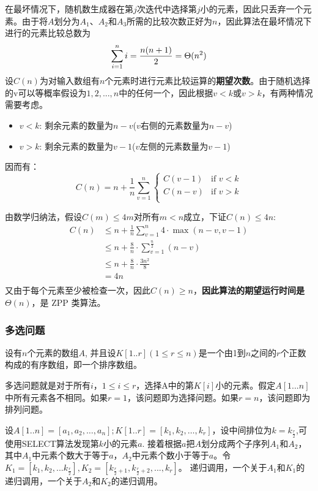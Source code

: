 \documentclass[./../main.tex]{subfiles} %
\begin{document}
在最坏情况下，随机数生成器在第$j$次迭代中选择第$j$小的元素，因此只丢弃一个元素。由于将$A$划分为$A_1$、$A_2$和$A_3$所需的比较次数正好为$n$，因此算法在最坏情况下进行的元素比较总数为
$$
\sum_{i=1}^n i=\frac{n(n+1)}{2}=\Theta(n^2)\\
$$
设$C(n)$为对输入数组有$n$个元素时进行元素比较运算的\textbf{期望次数}。由于随机选择的v可以等概率假设为$1,2,...,n$中的任何一个，因此根据$v<k$或$v>k$，有两种情况需要考虑。
\begin{itemize}
    \item $v<k$: 剩余元素的数量为$n-v$($v$右侧的元素数量为$n-v$)
    \item $v>k$: 剩余元素的数量为$v-1$($v$左侧的元素数量为$v-1$)
\end{itemize}

因而有：
$$
C(n)=n+\frac{1}{n}\sum_{v=1}^n\left\{
    \begin{array}{lc}
        C(v-1) & \text{if }v<k\\ 
        C(n-v) & \text{if }v>k\\
    \end{array}
\right.
$$

由数学归纳法，假设$C(m)\le4m$对所有$m<n$成立，下证$C(n)\le4n$:
\begin{align*}
    C(n)&\le n + \frac{1}{n}\sum_{v=1}^n4\cdot\max(n-v, v-1)\\
    &\le n + \frac{8}{n}\cdot \sum_{v=1}^{\frac{n}{2}}(n-v)\\
    &\le n + \frac{8}{n}\cdot \frac{3n^2}{8}\\
    &=  4n\\
\end{align*}
又由于每个元素至少被检查一次，因此$C(n)\ge n$，\textbf{因此算法的期望运行时间是}$\Theta(n)$，是 ZPP 类算法。

\subsubsection{多选问题}
设有$n$个元素的数组$A$, 并且设$K[1..r](1\le r\le n)$是一个由1到$n$之间的$r$个正数构成的有序数组，即一个排序数组。

多选问题就是对于所有$i$，$1\le i\le r$，选择A中的第$K[i]$小的元素。假定$A[1...n]$中所有元素各不相同。如果$r=1$，该问题即为选择问题。如果$r=n$，该问题即为排列问题。

设$A[1..n]=[a_1, a_2, \dots, a_n]; K[1..r]=[k_1, k_2, \dots, k_r]$，设中间排位为$k=k_{\frac{r}{2}}$,可使用SELECT算法发现第$k$小的元素$a$.
接着根据$a$把$A$划分成两个子序列$A_1$和$A_2$，其中$A_1$中元素个数大于等于$a$，$A_2$中元素个数小于等于$a$。令$K_1=[k_1,k_2,...k_{\frac{r}{2}}], K_2=[k_{\frac{r}{2}+1},k_{\frac{r}{2} + 2},...,k_r]$。
递归调用，一个关于$A_1$和$K_1$的递归调用，一个关于$A_2$和$K_2$的递归调用。
\end{document}
